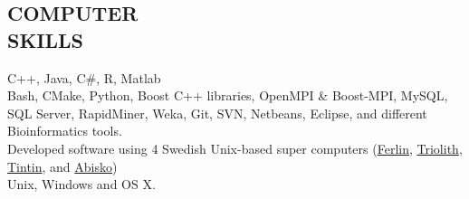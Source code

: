 \documentclass[margin, 10pt]{res} %
\begin{document}
\begin{resume}


\section{COMPUTER \\ SKILLS} 

{\bf \color{Brown}{Languages:}} 
C++, Java, C\#, R, Matlab \\
{\bf \color{Brown}{Misc Tools:}} Bash, CMake, Python, Boost C++ libraries, OpenMPI \& Boost-MPI, MySQL, SQL Server, RapidMiner, Weka, Git, SVN, Netbeans, Eclipse, and different Bioinformatics tools. \\
{\bf \color{Brown}{HPC Clusters:}} Developed software using 4 Swedish Unix-based super computers (\href{https://www.pdc.kth.se/resources/computers/ferlin}{Ferlin}, \href{https://www.nsc.liu.se/systems/triolith/}{Triolith}, \href{http://www.uppmax.uu.se/}{Tintin}, and \href{http://www.hpc2n.umu.se/resources/abisko}{Abisko}) \\
{\bf \color{Brown}{Operating Systems:}} Unix, Windows and OS X.



\end{resume}
\end{document}
